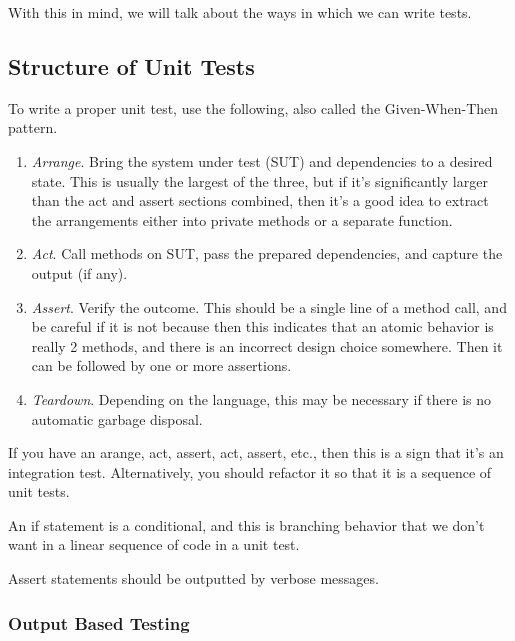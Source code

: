   With this in mind, we will talk about the ways in which we can write tests. 

\subsection{Structure of Unit Tests}

  To write a proper unit test, use the following, also called the Given-When-Then pattern. 
  \begin{enumerate}
    \item \textit{Arrange}. Bring the system under test (SUT) and dependencies to a desired state. This is usually the largest of the three, but if it's significantly larger than the act and assert sections combined, then it's a good idea to extract the arrangements either into private methods or a separate function. 
    \item \textit{Act}. Call methods on SUT, pass the prepared dependencies, and capture the output (if any). 
    \item \textit{Assert}. Verify the outcome. This should be a single line of a method call, and be careful if it is not because then this indicates that an atomic behavior is really 2 methods, and there is an incorrect design choice somewhere. Then it can be followed by one or more assertions. 
    \item \textit{Teardown}. Depending on the language, this may be necessary if there is no automatic garbage disposal. 
  \end{enumerate}

  If you have an arange, act, assert, act, assert, etc., then this is a sign that it's an integration test. Alternatively, you should refactor it so that it is a sequence of unit tests. 

  \begin{theorem}
    An if statement is a conditional, and this is branching behavior that we don't want in a linear sequence of code in a unit test. 
  \end{theorem}  

  Assert statements should be outputted by verbose messages. 

\subsubsection{Output Based Testing}

  \begin{definition}
    
  \end{definition}

